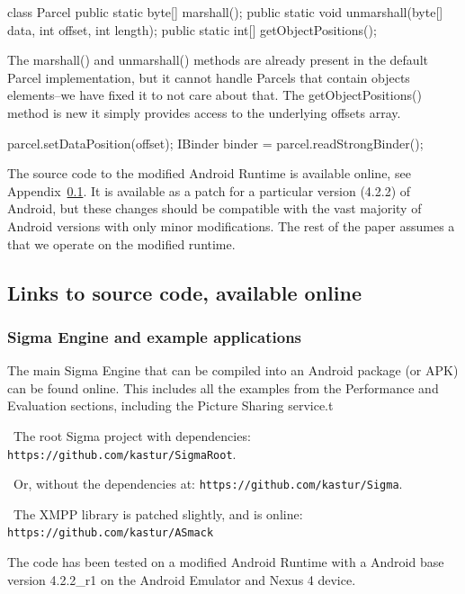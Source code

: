 \documentclass[prodmode]{acmlarge}
\begin{document}
\begin{snippet}
class Parcel {
  public static byte[] marshall();
  public static void unmarshall(byte[] data, int offset, int length);
  public static int[] getObjectPositions();
}
\end{snippet}

The marshall() and unmarshall() methods are already present in the default Parcel implementation, but it cannot handle Parcels that contain objects elements--we have fixed it to not care about that. The getObjectPositions() method is new it simply provides access to the underlying offsets array.

\begin{snippet}
parcel.setDataPosition(offset);
IBinder binder = parcel.readStrongBinder();
\end{snippet}

The source code to the modified Android Runtime is available online, see Appendix~\ref{app:SourceCode}. It is available as a patch for a particular version (4.2.2) of Android, but these changes should be compatible with the vast majority of Android versions with only minor modifications. The rest of the paper assumes a that we operate on the modified runtime.

\subsection{Links to source code, available online}
\label{app:SourceCode}

\subsubsection{Sigma Engine and example applications}
The main Sigma Engine that can be compiled into an Android package (or APK) can be found online. This includes all the examples from the Performance and Evaluation sections, including the Picture Sharing service.t

\noindent~The root Sigma project with dependencies: \verb|https://github.com/kastur/SigmaRoot|.

\noindent~Or, without the dependencies at: \verb|https://github.com/kastur/Sigma|.

\noindent~The XMPP library is patched slightly, and is online: \verb|https://github.com/kastur/ASmack|

The code has been tested on a modified Android Runtime with a Android base version 4.2.2\_r1 on the Android Emulator and Nexus 4 device.
\end{document}
